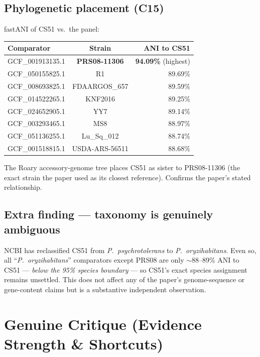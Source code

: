 \documentclass[11pt]{article}
\begin{document}
\subsection{Phylogenetic placement (C15)}

fastANI of CS51 vs.\ the panel:

\begin{center}
\begin{tabular}{lcr}
\toprule
Comparator & Strain & ANI to CS51 \\
\midrule
GCF\_001913135.1 & \textbf{PRS08-11306} & \textbf{94.09\%} (highest) \\
GCF\_050155825.1 & R1                    & 89.69\% \\
GCF\_008693825.1 & FDAARGOS\_657         & 89.59\% \\
GCF\_014522265.1 & KNF2016               & 89.25\% \\
GCF\_024652905.1 & YY7                   & 89.14\% \\
GCF\_003293465.1 & MS8                   & 88.97\% \\
GCF\_051136255.1 & Lu\_Sq\_012           & 88.74\% \\
GCF\_001518815.1 & USDA-ARS-56511        & 88.68\% \\
\bottomrule
\end{tabular}
\end{center}

The Roary accessory-genome tree places CS51 as sister to PRS08-11306 (the exact
strain the paper used as its closest reference). Confirms the paper's stated
relationship.

\subsection{Extra finding --- taxonomy is genuinely ambiguous}

NCBI has reclassified CS51 from \textit{P.\ psychrotolerans} to
\textit{P.\ oryzihabitans}. Even so, all ``\textit{P.\ oryzihabitans}''
comparators except PRS08 are only $\sim$88--89\% ANI to CS51 --- \emph{below the
95\% species boundary} --- so CS51's exact species assignment remains
unsettled. This does not affect any of the paper's genome-sequence or gene-content
claims but is a substantive independent observation.

\section{Genuine Critique (Evidence Strength \& Shortcuts)}
\end{document}
